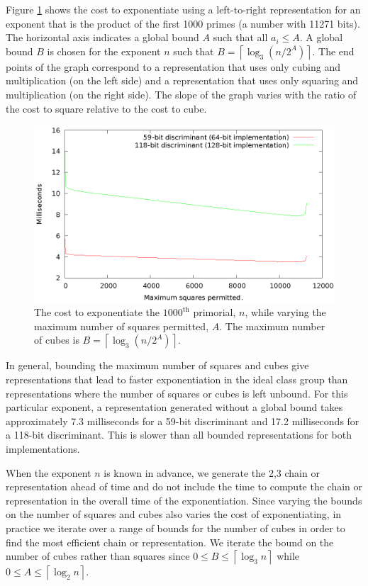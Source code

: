 \documentclass{ucalgthes1}
\theoremstyle{definition}
\newcommand{\ceil}[1]{\left\lceil #1 \right\rceil}
\begin{document}
Figure \ref{fig:dbnsL2rVaryBounds} shows the cost to exponentiate using a left-to-right representation for an exponent that is the product of the first 1000 primes (a number with 11271 bits).  The horizontal axis indicates a global bound $A$ such that all $a_i \le A$.  A global bound $B$ is chosen for the exponent $n$ such that $B = \ceil{\log_3(n/2^A)}$.  The end points of the graph correspond to a representation that uses only cubing and multiplication (on the left side) and a representation that uses only squaring and multiplication (on the right side).  The slope of the graph varies with the ratio of the cost to square relative to the cost to cube.

\begin{figure}[H]
\centering
\includegraphics{dbns_l2r_vary_bounds}
\caption{The cost to exponentiate the $1000^{\textrm{th}}$ primorial, $n$, while varying the maximum number of squares permitted, $A$. The maximum number of cubes is $B = \ceil{\log_3(n/2^A)}$.}
\label{fig:dbnsL2rVaryBounds}
\end{figure}

In general, bounding the maximum number of squares and cubes give representations that lead to faster exponentiation in the ideal class group than representations where the number of squares or cubes is left unbound.  For this particular exponent, a representation generated without a global bound takes approximately 7.3 milliseconds for a 59-bit discriminant and 17.2 milliseconds for a 118-bit discriminant.  This is slower than all bounded representations for both implementations.

When the exponent $n$ is known in advance, we generate the 2,3 chain or representation ahead of time and do not include the time to compute the chain or representation in the overall time of the exponentiation.  Since varying the bounds on the number of squares and cubes also varies the cost of exponentiating, in practice we iterate over a range of bounds for the number of cubes in order to find the most efficient chain or representation.  We iterate the bound on the number of cubes rather than squares since $0 \le B \le \ceil{\log_3 n}$ while $0 \le A \le \ceil{\log_2 n}$.
\end{document}
